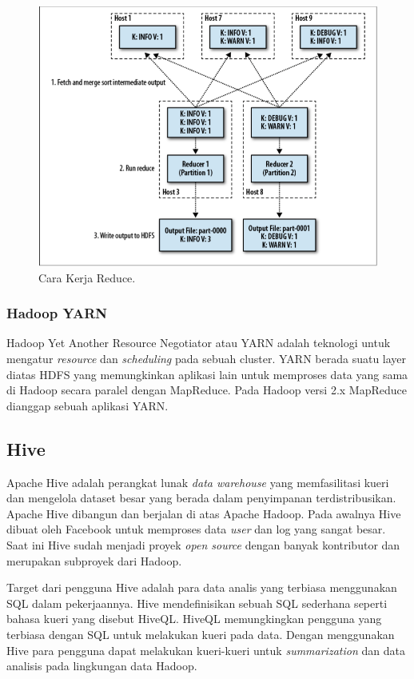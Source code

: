 \begin{figure}
	\centering
	\includegraphics[scale=0.5]{Gambar/how-reducer-works.png}
	\caption[Cara  Kerja Reduce]{Cara Kerja Reduce.\cite{sammer2012hadoop}}
	\label{fig:reducer_works}
\end{figure}
	
\subsubsection{Hadoop YARN}
Hadoop Yet Another Resource Negotiator atau YARN adalah teknologi untuk mengatur \textit{resource} dan \textit{scheduling} pada sebuah cluster. YARN berada suatu layer diatas HDFS yang memungkinkan aplikasi lain untuk memproses data yang sama di Hadoop secara paralel dengan MapReduce. Pada Hadoop versi 2.x MapReduce dianggap sebuah aplikasi YARN.

\subsection{Hive}
\label{sec:hive}
Apache Hive adalah perangkat lunak \textit{data warehouse} yang memfasilitasi kueri dan mengelola dataset besar yang berada dalam penyimpanan terdistribusikan. Apache Hive dibangun dan berjalan di atas Apache Hadoop. Pada awalnya Hive dibuat oleh Facebook untuk memproses data \textit{user} dan log yang sangat besar. Saat ini Hive sudah menjadi proyek \textit{open source} dengan banyak kontributor dan merupakan subproyek dari Hadoop.  

Target dari pengguna Hive adalah para data analis yang terbiasa menggunakan SQL dalam pekerjaannya. Hive mendefinisikan sebuah SQL sederhana seperti bahasa kueri yang disebut HiveQL. HiveQL memungkingkan pengguna yang terbiasa dengan SQL untuk melakukan kueri pada data. Dengan menggunakan Hive para pengguna dapat melakukan kueri-kueri untuk \textit{summarization} dan data analisis pada lingkungan data Hadoop. 

